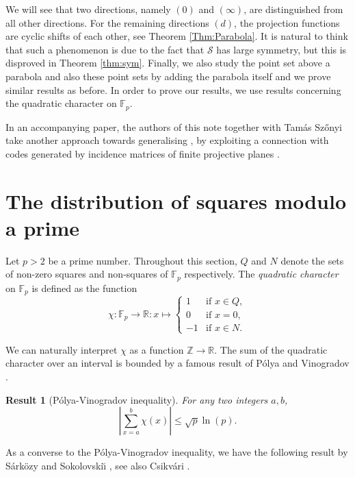 \documentclass[a4paper, 12pt]{article}
\newtheorem{res}[thm]{Result}
\theoremstyle{definition}
\newcommand{\RR}{\mathbb R}
\newcommand{\FF}{\mathbb F}
\newcommand{\ZZ}{\mathbb Z}
\begin{document}
We will see that two directions, namely $(0)$ and $(\infty)$, are distinguished from all other directions.
For the remaining directions $(d)$, the projection functions are cyclic shifts of each other, see Theorem \ref{Thm:Parabola}.
It is natural to think that such a phenomenon is due to the fact that $\mathcal S$ has large symmetry, but this is disproved in Theorem \ref{thm:sym}.
Finally, we also study the point set above a parabola and also these point sets by adding the parabola itself and we prove similar results as before. 
In order to prove our results, we use results concerning the quadratic character on $\FF_p$.

\bigskip

In an accompanying paper, the authors of this note together with Tam\'as Sz\H onyi take another approach towards generalising , by exploiting a connection with codes generated by incidence matrices of finite projective planes \cite{Directions}.


\section{The distribution of squares modulo a prime}

Let $p>2$ be a prime number.
Throughout this section, $Q$ and $N$ denote the sets of non-zero squares and non-squares of $\FF_p$ respectively.
The \emph{quadratic character} on $\FF_p$ is defined as the function
\[
 \chi: \FF_p \to \RR: x \mapsto \begin{cases}
  1 & \text{if } x \in Q, \\
  0 & \text{if } x = 0, \\
  -1 & \text{if } x \in N.
 \end{cases}
\]

We can naturally interpret $\chi$ as a function $\ZZ \to \RR$.
The sum of the quadratic character over an interval is bounded by a famous result of P\'olya \cite{Polya:18} and Vinogradov \cite{Vinogradov:18}.


\begin{res}[P\'olya-Vinogradov inequality]
 \label{Res:PolyaVinogradov}
 For any two integers $a, b$,
 \[
  \left| \sum_{x=a}^b \chi(x) \right| \leq \sqrt p \ln(p).
 \]
\end{res}

As a converse to the P\'olya-Vinogradov inequality, we have the following result by S\'arközy \cite{Sarkozy:77} and Sokolovski\u{\i} \cite{Sokolovskii:82}, see also Csikv\'ari \cite{Csikvari:09}.
\end{document}
